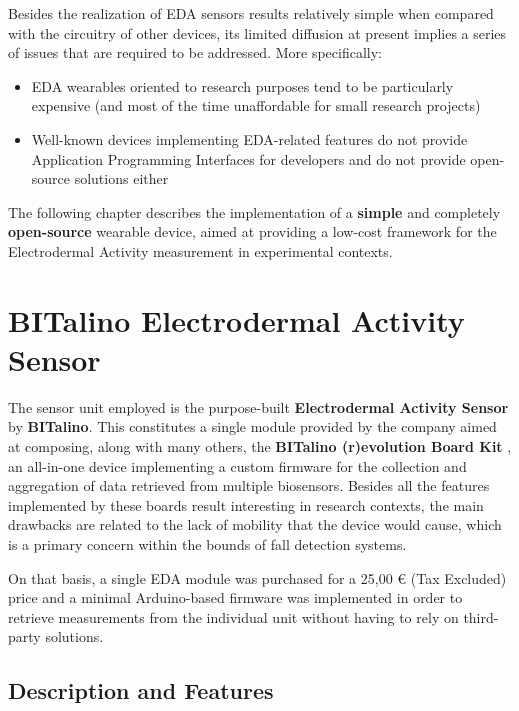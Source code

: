\label{ch:implementation}

Besides the realization of EDA sensors results relatively simple when compared with the circuitry of other devices, its limited diffusion at present implies a series of issues that are required to be addressed. More specifically:

\begin{itemize}
    \item EDA wearables oriented to research purposes tend to be particularly expensive (and most of the time unaffordable for small research projects)
    \item Well-known devices implementing EDA-related features do not provide Application Programming Interfaces for developers and do not provide open-source solutions either
\end{itemize}

The following chapter describes the implementation of a \textbf{simple} and completely \textbf{open-source} wearable device, aimed at providing a low-cost framework for the Electrodermal Activity measurement in experimental contexts.

\section{BITalino Electrodermal Activity Sensor}\label{sec:bitalino}

The sensor unit employed is the purpose-built \textbf{Electrodermal Activity Sensor} by \textbf{BITalino}. This constitutes a single module provided by the company aimed at composing, along with many others, the \textbf{BITalino (r)evolution Board Kit} \cite{bitalino-general}, an all-in-one device implementing a custom firmware for the collection and aggregation of data retrieved from multiple biosensors. Besides all the features implemented by these boards result interesting in research contexts, the main drawbacks are related to the lack of mobility that the device would cause, which is a primary concern within the bounds of fall detection systems.

On that basis, a single EDA module was purchased for a 25,00 € (Tax Excluded) price and a minimal Arduino-based firmware was implemented in order to retrieve measurements from the individual unit without having to rely on third-party solutions.

\subsection{Description and Features}\label{sec:bitalino-features}






